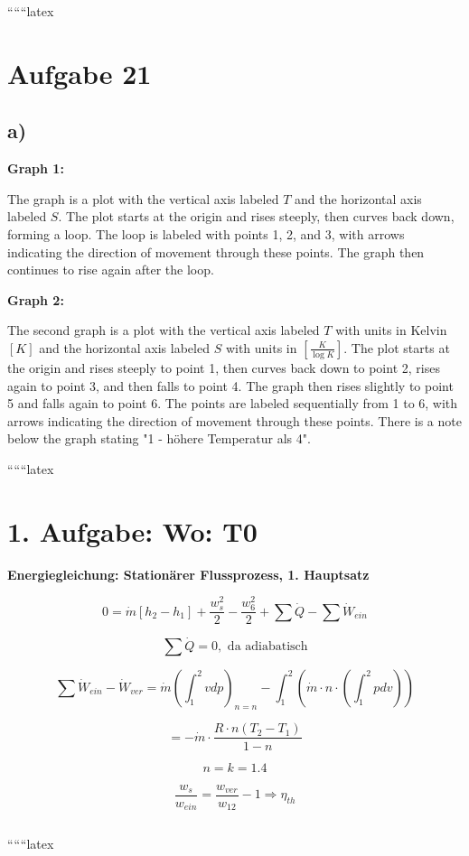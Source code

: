
``````latex


\section*{Aufgabe 21}

\subsection*{a)}

\textbf{Graph 1:} 

The graph is a plot with the vertical axis labeled \( T \) and the horizontal axis labeled \( S \). The plot starts at the origin and rises steeply, then curves back down, forming a loop. The loop is labeled with points 1, 2, and 3, with arrows indicating the direction of movement through these points. The graph then continues to rise again after the loop.

\textbf{Graph 2:}

The second graph is a plot with the vertical axis labeled \( T \) with units in Kelvin \([K]\) and the horizontal axis labeled \( S \) with units in \(\left[\frac{K}{\log K}\right]\). The plot starts at the origin and rises steeply to point 1, then curves back down to point 2, rises again to point 3, and then falls to point 4. The graph then rises slightly to point 5 and falls again to point 6. The points are labeled sequentially from 1 to 6, with arrows indicating the direction of movement through these points. There is a note below the graph stating "1 - höhere Temperatur als 4".

``````latex


\section*{1. Aufgabe: Wo: T0}

\textbf{Energiegleichung: Stationärer Flussprozess, 1. Hauptsatz}

\[
0 = \dot{m} \left[ h_2 - h_1 \right] + \frac{w_s^2}{2} - \frac{w_6^2}{2} + \sum \dot{Q} - \sum \dot{W}_{ein}
\]

\[
\sum \dot{Q} = 0, \text{ da adiabatisch}
\]

\[
\sum \dot{W}_{ein} - \dot{W}_{ver} = \dot{m} \left( \int_{1}^{2} v dp \right)_{n=n} - \int_{1}^{2} \left( \dot{m} \cdot n \cdot \left( \int_{1}^{2} p dv \right) \right)
\]

\[
= - \dot{m} \cdot \frac{R \cdot n \left( T_2 - T_1 \right)}{1 - n}
\]

\[
n = k = 1.4
\]

\[
\frac{w_s}{w_{ein}} = \frac{w_{ver}}{w_{12}} - 1 \Rightarrow \eta_{th}
\]

\[
\boxed{}
\]

``````latex


